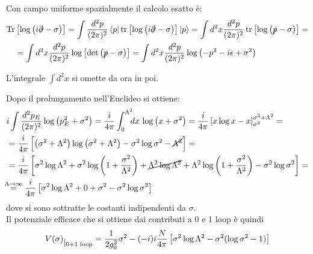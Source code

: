 \documentclass[a4paper,11pt]{amsart}
\newcommand{\ket}[1]{\left | #1 \right \rangle}
\newcommand{\bra}[1]{\left \langle  #1 \right |}
\newcommand{\nl}{\vskip 0.3cm}
\newcommand{\de}[1]{\frac{d^2#1}{(2\pi)^2}}
\DeclareMathOperator{\Tr}{Tr}
\DeclareMathOperator{\tr}{tr}
\begin{document}
Con campo uniforme spazialmente il calcolo esatto è:
\begin{align*}
 \Tr &\left[\log\left(i\slashed{\partial} -  \sigma\right)\right] = \int \de{p}\bra{p}\tr\left[\log\left(i\slashed{\partial} -  \sigma\right)\right]\ket{p} = \int d^2x \de{p} \tr\left[\log\left(\slashed{p} -  \sigma\right)\right] = \\
 & = \int d^2x \de{p} \log \left[ \det\left (\slashed{p} -  \sigma\right)\right] = \int d^2x \de{p} \log \left( -p^2 -i\epsilon + \sigma^2 \right)
\end{align*}

L'integrale $ \int d^2x$ si omette da ora in poi.
\nl

Dopo il prolungamento nell'Euclideo si ottiene:
\begin{align*}
& i\int \frac{d^2p_E}{(2\pi)^2} \log\left(p_E^2 + \sigma^2\right) = \frac{i}{4\pi} \int_{0}^{\Lambda^2}\!\!\!dx\,\log\left(x+\sigma^2\right) = \frac{i}{4\pi}\left[x\log x - x\right]_{\sigma^2}^{\sigma^2 + \Lambda^2} = \\
& = \frac{i}{4\pi}\left[ \left(\sigma^2+ \Lambda^2\right)\log\left(\sigma^2+\Lambda^2\right) -\sigma^2\log\sigma^2 - \cancel{\Lambda^2} \right] = \\
& = \frac{i}{4\pi}\left[ \sigma^2 \log \Lambda^2 + \sigma^2 \log\left(1+\frac{\sigma^2}{\Lambda^2}\right) + \cancel{\Lambda^2 \log \Lambda^2} + \Lambda^2 \log \left(1+\frac{\sigma^2}{\Lambda^2}\right)-\sigma^2\log\sigma^2\right] = \\
& \!\!\!\stackrel{\Lambda\to\infty}{=} \frac{i}{4\pi}\left[ \sigma^2 \log \Lambda^2 + 0 + \sigma^2 -\sigma^2\log\sigma^2\right]
\end{align*}
dove si sono sottratte le costanti indipendenti da $\sigma$.\\
Il potenziale efficace che si ottiene dai contributi a 0 e 1 loop è quindi 
\[
 V(\sigma)\raisebox{-0.15cm}{$|_{\text{0+1 loop}}$} = \frac{1}{2g_0^2}\sigma^2 - (-i)i\frac{N}{4\pi}\left[\sigma^2\log\Lambda^2 - \sigma^2 (\log  \sigma^2 -1)\right]
\]
\end{document}
